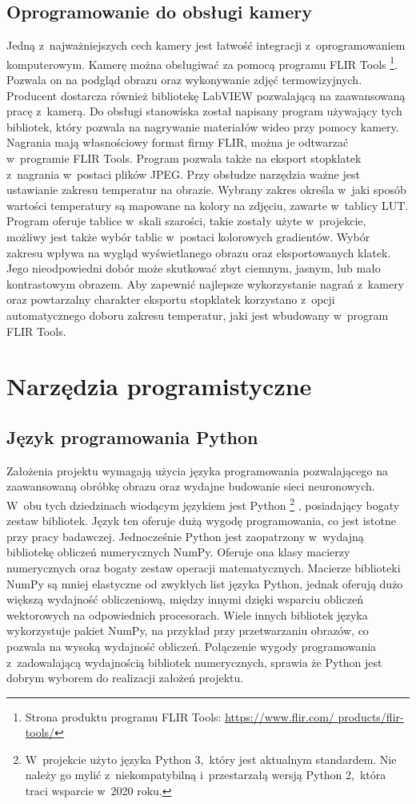 \subsection{Oprogramowanie do obsługi kamery}
\label{subsec:camera_soft}
Jedną z~najważniejszych cech kamery jest łatwość integracji z~oprogramowaniem
komputerowym.
Kamerę można obsługiwać za pomocą programu FLIR Tools%
\footnote{%
    Strona produktu programu FLIR Tools:
    \url{https://www.flir.com/   products/flir-tools/}}.
Pozwala on na podgląd obrazu oraz wykonywanie zdjęć termowizyjnych.
Producent dostarcza również bibliotekę LabVIEW pozwalającą na zaawansowaną
pracę z~kamerą.
Do obsługi stanowiska został napisany program używający tych bibliotek, który
pozwala na nagrywanie materiałów wideo przy pomocy kamery.
Nagrania mają własnościowy format firmy FLIR, można je odtwarzać w~programie
FLIR Tools.
Program pozwala także na eksport stopklatek z~nagrania w~postaci plików JPEG.
Przy obsłudze narzędzia ważne jest ustawianie zakresu temperatur na obrazie.
Wybrany zakres określa w~jaki sposób wartości temperatury są mapowane na kolory
na zdjęciu, zawarte w~tablicy LUT.
Program oferuje tablice w~skali szarości, takie zostały użyte w~projekcie,
możliwy jest także wybór tablic w~postaci kolorowych gradientów.
Wybór zakresu wpływa na wygląd wyświetlanego obrazu oraz eksportowanych klatek.
Jego nieodpowiedni dobór może skutkować zbyt ciemnym, jasnym, lub mało
kontrastowym obrazem.
Aby zapewnić najlepsze wykorzystanie nagrań z~kamery oraz powtarzalny charakter
eksportu stopklatek korzystano z~opcji automatycznego doboru zakresu temperatur, 
jaki jest wbudowany w~program FLIR Tools.

\section{Narzędzia programistyczne}

\subsection{Język programowania Python}
Założenia projektu wymagają użycia języka programowania pozwalającego na
zaawansowaną obróbkę obrazu oraz wydajne budowanie sieci neuronowych.
W~obu tych dziedzinach wiodącym językiem jest Python%
\footnote{%
    W~projekcie użyto języka Python 3,~który jest aktualnym standardem.
    Nie należy go mylić z~niekompatybilną i~przestarzałą wersją Python 2,~która
    traci wsparcie w~2020 roku.
}
, posiadający bogaty zestaw
bibliotek.
Język ten oferuje dużą wygodę programowania, co jest istotne przy pracy
badawczej.
Jednocześnie Python jest zaopatrzony w~wydajną bibliotekę obliczeń numerycznych
NumPy.
Oferuje ona klasy macierzy numerycznych oraz bogaty zestaw operacji
matematycznych.
Macierze biblioteki NumPy są mniej elastyczne od zwykłych list języka Python,
jednak oferują dużo większą wydajność obliczeniową, między innymi dzięki
wsparciu obliczeń wektorowych na odpowiednich procesorach.
Wiele innych bibliotek języka wykorzystuje pakiet NumPy, na przykład przy
przetwarzaniu obrazów, co pozwala na wysoką wydajność obliczeń.
Połączenie wygody programowania z~zadowalającą wydajnością bibliotek
numerycznych, sprawia że Python jest dobrym wyborem do realizacji założeń
projektu.

